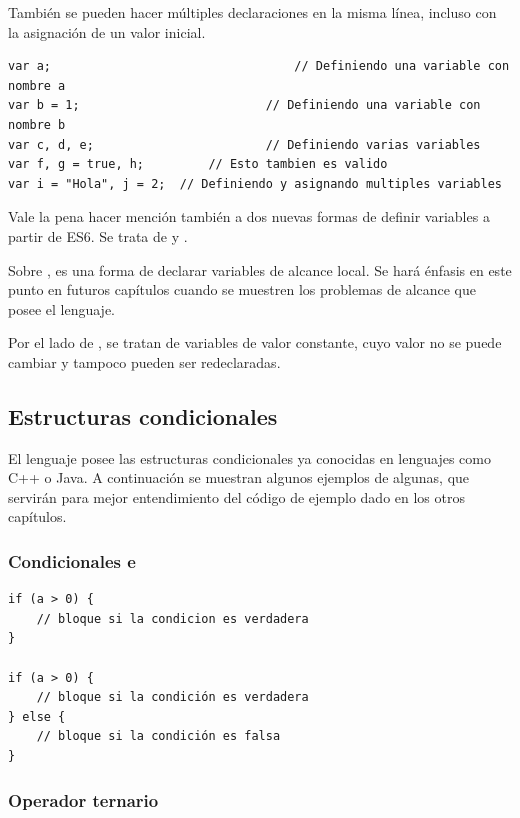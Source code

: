 También se pueden hacer múltiples declaraciones en la misma línea, incluso con la asignación de un valor inicial.

\begin{lstlisting}[title={Declarando variables}]
var a;									// Definiendo una variable con nombre a
var b = 1; 	 						// Definiendo una variable con nombre b
var c, d, e;	 					// Definiendo varias variables
var f, g = true, h;			// Esto tambien es valido
var i = "Hola", j = 2;	// Definiendo y asignando multiples variables
\end{lstlisting}

Vale la pena hacer mención también a dos nuevas formas de definir variables a partir de ES6. Se trata de  y .

Sobre , es una forma de declarar variables de alcance local. Se hará énfasis en este punto en futuros capítulos cuando se muestren los problemas de alcance que posee el lenguaje.

Por el lado de , se tratan de variables de valor constante, cuyo valor no se puede cambiar y tampoco pueden ser redeclaradas.

\subsection{Estructuras condicionales}

El lenguaje posee las estructuras condicionales ya conocidas en lenguajes como C++ o Java. A continuación se muestran algunos ejemplos de algunas, que servirán para mejor entendimiento del código de ejemplo dado en los otros capítulos.

\subsubsection{Condicionales  e }

\begin{lstlisting}[title={Ejemplos de \code{if} e \code{if-else}}]
if (a > 0) {
	// bloque si la condicion es verdadera 
}

if (a > 0) {
	// bloque si la condición es verdadera
} else {
	// bloque si la condición es falsa
}
\end{lstlisting}

\subsubsection{Operador ternario }

